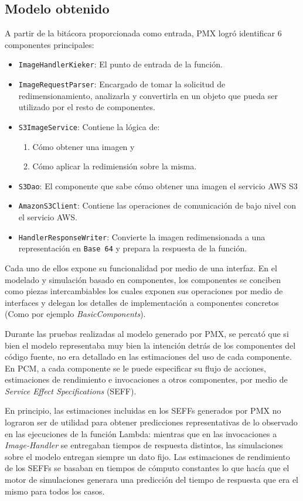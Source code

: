 \subsection{Modelo obtenido}
A partir de la bitácora proporcionada como entrada, PMX logró identificar 6 componentes principales:
\begin{itemize}
    \item \texttt{ImageHandlerKieker}: El punto de entrada de la función.
    \item \texttt{ImageRequestParser}: Encargado de tomar la solicitud de redimensionamiento, analizarla y convertirla en un objeto que pueda ser utilizado por el resto de componentes.
    \item \texttt{S3ImageService}: Contiene la lógica de:
        \begin{enumerate}
            \item Cómo obtener una imagen y
            \item Cómo aplicar la redimiensión sobre la misma.
        \end{enumerate}
    \item \texttt{S3Dao}: El componente que sabe cómo obtener una imagen el servicio AWS S3
    \item \texttt{AmazonS3Client}: Contiene las operaciones de comunicación de bajo nivel con el servicio AWS.
    \item \texttt{HandlerResponseWriter}: Convierte la imagen redimensionada a una representación en \texttt{Base 64} y prepara la respuesta de la función.
\end{itemize}


Cada uno de ellos expone su funcionalidad por medio de una interfaz. En el modelado y simulación basado en componentes, los componentes se conciben como piezas intercambiables los cuales exponen sus operaciones por medio de interfaces y delegan los detalles de implementación a componentes concretos (Como por ejemplo \emph{BasicComponents}). 


Durante las pruebas realizadas al modelo generado por PMX, se percató que si bien el modelo representaba muy bien la intención detrás de los componentes del código fuente, no era detallado en las estimaciones del uso de cada componente. En PCM, a cada componente se le puede especificar su flujo de acciones, estimaciones de rendimiento e invocaciones a otros componentes, por medio de \emph{Service Effect Specifications} (SEFF). 

En principio, las estimaciones incluidas en los SEFFs generados por PMX no lograron ser de utilidad para obtener predicciones representativas de lo observado en las ejecuciones de la función Lambda: mientras que en las invocaciones a \emph{Image-Handler} se entregaban tiempos de respuesta distintos, las simulaciones sobre el modelo entregan siempre un dato fijo. Las estimaciones de rendimiento de los SEFFs se basaban en tiempos de cómputo constantes lo que hacía que el motor de simulaciones generara una predicción del tiempo de respuesta que era el mismo para todos los casos.

